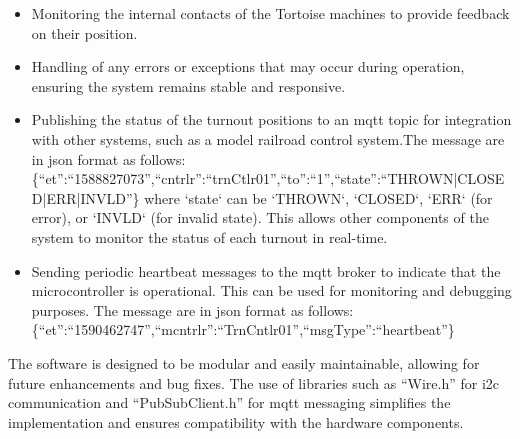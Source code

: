 \begin{itemize}
\item Monitoring the internal contacts of the Tortoise machines to provide feedback on their position.
\item Handling of any errors or exceptions that may occur during operation, ensuring the system remains stable and responsive.
\item Publishing the status of the turnout positions to an \gls{mqtt} topic for integration with other systems, such as a model railroad control system.The message are in \gls{json} format as follows:\\
\{``et'':``1588827073'',``cntrlr'':``trnCtlr01'',``to'':``1'',``state'':``THROWN|CLOSED|ERR|INVLD''\}
where `state` can be `THROWN`, `CLOSED`, `ERR` (for error), or `INVLD` (for invalid state). This allows other components of the system to monitor the status of each turnout in real-time.
\item Sending periodic heartbeat messages to the \gls{mqtt} broker to indicate that the microcontroller is operational. This can be used for monitoring and debugging purposes. The message are in \gls{json} format as follows:\\
\{``et'':``1590462747'',``mcntrlr'':``TrnCntlr01'',``msgType'':``heartbeat''\}
\end{itemize}
The software is designed to be modular and easily maintainable, allowing for future enhancements and bug fixes. The use of libraries such as ``Wire.h'' for \gls{i2c} communication and ``PubSubClient.h'' for \gls{mqtt} messaging simplifies the implementation and ensures compatibility with the hardware components.
